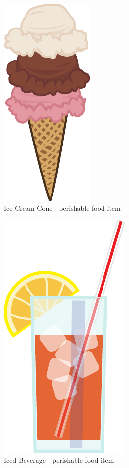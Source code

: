 \begin{figure}[p]
	\centering\includegraphics[height=.8\paperheight]{images/items_icecreamcone}
	\caption{Ice Cream Cone - perishable food item}
\end{figure}
\begin{figure}[p]
	\centering\includegraphics[height=.8\paperheight]{images/items_iceddrink}
	\caption{Iced Beverage - perishable food item}
\end{figure}
